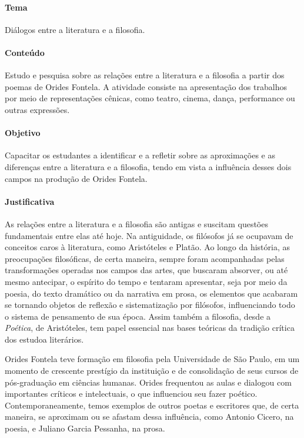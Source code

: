 \documentclass[12pt]{extarticle}
\begin{document}
\paragraph{Tema} Diálogos entre a literatura e a filosofia.

\paragraph{Conteúdo} Estudo e pesquisa sobre as relações entre a
literatura e a filosofia a partir dos poemas de Orides Fontela. A
atividade consiste na apresentação dos trabalhos por meio de
representações cênicas, como teatro, cinema, dança, performance ou
outras expressões.

\paragraph{Objetivo} Capacitar os estudantes a identificar e a refletir
sobre as aproximações e as diferenças entre a literatura e a filosofia,
tendo em vista a influência desses dois campos na produção de Orides
Fontela.

\paragraph{Justificativa} As relações entre a literatura e a filosofia são
antigas e suscitam questões fundamentais entre elas até hoje. Na
antiguidade, os filósofos já se ocupavam de conceitos caros à
literatura, como Aristóteles e Platão. Ao longo da história, as
preocupações filosóficas, de certa maneira, sempre foram acompanhadas
pelas transformações operadas nos campos das artes, que buscaram
absorver, ou até mesmo antecipar, o espírito do tempo e tentaram
apresentar, seja por meio da poesia, do texto dramático ou da narrativa
em prosa, os elementos que acabaram se tornando objetos de reflexão e
sistematização por filósofos, influenciando todo o sistema de pensamento
de sua época. Assim também a filosofia, desde a \emph{Poética}, de
Aristóteles, tem papel essencial nas bases teóricas da tradição crítica
dos estudoa literários.

Orides Fontela teve formação em filosofia pela Universidade de São
Paulo, em um momento de crescente prestígio da instituição e de
consolidação de seus cursos de pós-graduação em ciências humanas. Orides
frequentou as aulas e dialogou com importantes críticos e intelectuais,
o que influenciou seu fazer poético. Contemporaneamente, temos exemplos
de outros poetas e escritores que, de certa maneira, se aproximam ou se
afastam dessa influência, como Antonio Cicero, na poesia, e Juliano
Garcia Pessanha, na prosa.
\end{document}
